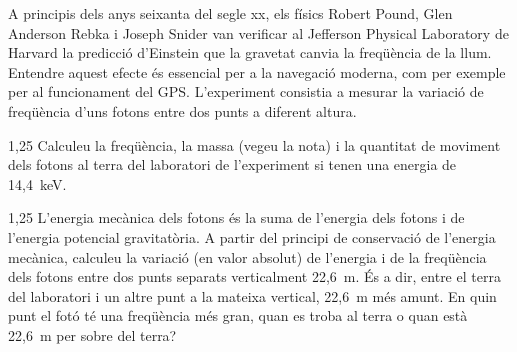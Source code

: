 A principis dels anys seixanta del segle xx, els físics Robert Pound, Glen Anderson Rebka i Joseph Snider van verificar al Jefferson Physical Laboratory de Harvard la predicció d'Einstein que la gravetat canvia la freqüència de la llum. Entendre aquest efecte és essencial per a la navegació moderna, com per exemple per al funcionament del GPS. L'experiment consistia a mesurar la variació de freqüència d'uns fotons entre dos punts a diferent altura.


\begin{apartat}{1,25}
Calculeu la freqüència, la massa (vegeu la nota) i la quantitat de moviment dels fotons al terra del laboratori de l'experiment si tenen una energia de 14,4~keV.
\end{apartat}

\begin{apartat}{1,25}
L'energia mecànica dels fotons és la suma de l'energia dels fotons i de l'energia potencial gravitatòria. A partir del principi de conservació de l'energia mecànica, calculeu la variació (en valor absolut) de l'energia i de la freqüència dels fotons entre dos punts separats verticalment 22,6~m. És a dir, entre el terra del laboratori i un altre punt a la mateixa vertical, 22,6~m més amunt. En quin punt el fotó té una freqüència més gran, quan es troba al terra o quan està 22,6~m per sobre del terra?
\end{apartat}


